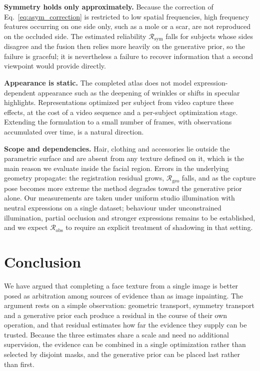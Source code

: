 \documentclass[runningheads]{llncs}
\newcommand{\Rel}{\mathcal{R}}
\begin{document}
\textbf{Symmetry holds only approximately.} Because the correction of
Eq.~\eqref{eq:asym_correction} is restricted to low spatial frequencies, high
frequency features occurring on one side only, such as a mole or a scar, are
not reproduced on the occluded side. The estimated reliability
$\Rel_{\text{sym}}$ falls for subjects whose sides disagree and the fusion then
relies more heavily on the generative prior, so the failure is graceful; it is
nevertheless a failure to recover information that a second viewpoint would
provide directly.

\textbf{Appearance is static.} The completed atlas does not model
expression-dependent appearance such as the deepening of wrinkles or shifts in
specular highlights. Representations optimized per subject from video
\cite{gafni2021nerface,grassal2022nha,qian2024gaussianavatars,zhang2025fate}
capture these effects, at the cost of a video sequence and a per-subject
optimization stage. Extending the formulation to a small number of frames, with
observations accumulated over time, is a natural direction.

\textbf{Scope and dependencies.} Hair, clothing and accessories lie outside the
parametric surface and are absent from any texture defined on it, which is the
main reason we evaluate inside the facial region. Errors in the underlying
geometry propagate: the registration residual grows, $\Rel_{\text{geo}}$ falls,
and as the capture pose becomes more extreme the method degrades toward the
generative prior alone. Our measurements are taken under uniform studio
illumination with neutral expressions on a single dataset; behaviour under
unconstrained illumination, partial occlusion and stronger expressions remains
to be established, and we expect $\Rel_{\text{obs}}$ to require an explicit
treatment of shadowing in that setting.

\section{Conclusion}

We have argued that completing a face texture from a single image is better
posed as arbitration among sources of evidence than as image inpainting. The
argument rests on a simple observation: geometric transport, symmetry transport
and a generative prior each produce a residual in the course of their own
operation, and that residual estimates how far the evidence they supply can be
trusted. Because the three estimates share a scale and need no additional
supervision, the evidence can be combined in a single optimization rather than
selected by disjoint masks, and the generative prior can be placed last rather
than first.
\end{document}
